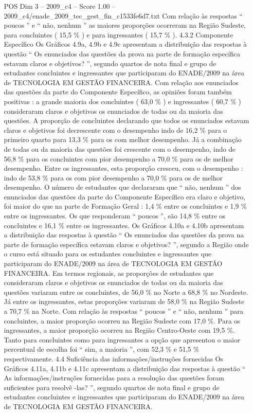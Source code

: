 \begin{textsample}{POS Dim 3 – 2009\_c4 – Score 1.00 – 2009\_c4/enade\_2009\_tec\_gest\_fin\_c1533fe6d7.txt}
Com relação às respostas “ poucos ” e “ não, nenhum ” as maiores proporções ocorreram na Região Sudeste, para concluintes ( 15,5 \% ) e para ingressantes ( 15,7 \% ). 4.3.2 Componente Específico Os Gráficos 4.9a, 4.9b e 4.9c apresentam a distribuição das respostas à questão “ Os enunciados das questões da prova na parte de formação específica estavam claros e objetivos? ”, segundo quartos de nota final e grupo de estudantes concluintes e ingressantes que participaram do ENADE/2009 na área de TECNOLOGIA EM GESTÃO FINANCEIRA.
Com relação aos enunciados das questões da parte do Componente Específico, as opiniões foram também positivas : a grande maioria dos concluintes ( 63,0 \% ) e ingressantes ( 60,7 \% ) consideraram claros e objetivos os enunciados de todas ou da maioria das questões.
A proporção de concluintes declarando que todos os enunciados estavam claros e objetivos foi decrescente com o desempenho indo de 16,2 \% para o primeiro quarto para 13,3 \% para os com melhor desempenho.
Já a combinação de todas ou da maioria das questões foi crescente com o desempenho, indo de 56,8 \% para os concluintes com pior desempenho a 70,0 \% para os de melhor desempenho.
Entre os ingressantes, esta proporção cresceu, com o desempenho : indo de 53,8 \% para os com pior desempenho a 70,0 \% para os de melhor desempenho.
O número de estudantes que declararam que “ não, nenhum ” dos enunciados das questões da parte do Componente Específico era claro e objetivo, foi maior do que na parte de Formação Geral : 1,4 \% entre os concluintes e 1,9 \% entre os ingressantes.
Os que responderam “ poucos ”, são 14,8 \% entre os concluintes e 16,1 \% entre os ingressantes.
Os Gráficos 4.10a e 4.10b apresentam a distribuição das respostas à questão “ Os enunciados das questões da prova na parte de formação específica estavam claros e objetivos? ”, segundo a Região onde o curso está situado para os estudantes concluintes e ingressantes que participaram do ENADE/2009 na área de TECNOLOGIA EM GESTÃO FINANCEIRA.
Em termos regionais, as proporções de estudantes que consideraram claros e objetivos os enunciados de todas ou da maioria das questões variaram entre os concluintes, de 56,0 \% no Norte a 68,8 \% no Nordeste.
Já entre os ingressantes, estas proporções variaram de 58,0 \% na Região Sudeste a 70,7 \% na Norte.
Com relação às respostas “ poucos ” e “ não, nenhum ” para concluintes, a maior proporção ocorreu na Região Sudeste com 17,0 \%.
Para os ingressantes, a maior proporção ocorreu na Região Centro-Oeste com 19,5 \%.
Tanto para concluintes como para ingressantes a opção que apresentou o maior percentual de escolha foi “ sim, a maioria ”, com 52,3 \% e 51,5 \% respectivamente. 4.4 Suficiência das informações/instruções fornecidas Os Gráficos 4.11a, 4.11b e 4.11c apresentam a distribuição das respostas à questão “ As informações/instruções fornecidas para a resolução das questões foram suficientes para resolvê -las? ”, segundo quartos de nota final e grupo de estudantes concluintes e ingressantes que participaram do ENADE/2009 na área de TECNOLOGIA EM GESTÃO FINANCEIRA.

\end{textsample}
